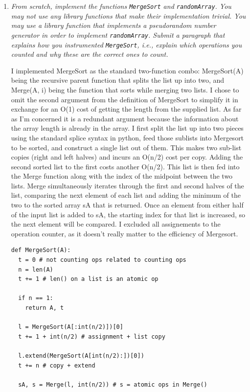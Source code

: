 \documentclass[12pt]{article} \setlength{\oddsidemargin}{0in}
\begin{document}
\begin{enumerate}
\item\textit{From scratch, implement the functions \texttt{MergeSort} and \texttt{randomArray}. You may not use any library functions that make their implementation trivial. You may use a library function that implements a pseudorandom number generator in order to implement \texttt{randomArray}.
Submit a paragraph that explains how you instrumented \texttt{MergeSort}, i.e., explain which operations you counted and why these are the correct ones to count.} 

I implemented MergeSort as the standard two-function combo: MergeSort(A) being the recursive parent function that splits the list up into two, and Merge(A, i) being the function that sorts while merging two lists. I chose to omit the second argument from the definition of MergeSort to simplify it in exchange for an O(1) cost of getting the length from the supplied list. As far as I'm concerned it is a redundant argument because the information about the array length is already in the array. I first split the list up into two pieces using the standard splice syntax in python, feed those sublists into Mergesort to be sorted, and construct a single list out of them. This makes two sub-list copies (right and left halves) and incurs an O(n/2) cost per copy. Adding the second sorted list to the first costs another O(n/2). This list is then fed into the Merge function along with the index of the midpoint between the two lists. Merge simultaneously iterates through the first and second halves of the list, comparing the next element of each list and adding the minimum of the two to the sorted array sA that is returned. Once an element from either half of the input list is added to sA, the starting index for that list is increased, so the next element will be compared. I excluded all assignements to the operation counter, as it doesn't really matter to the efficiency of Mergesort. 
\pagebreak
\begin{verbatim}
def MergeSort(A):
  t = 0 # not counting ops related to counting ops
  n = len(A) 
  t += 1 # len() on a list is an atomic op
  
  if n == 1:
    return A, t
  
  l = MergeSort(A[:int(n/2)])[0] 
  t += 1 + int(n/2) # assignment + list copy
  
  l.extend(MergeSort(A[int(n/2):])[0]) 
  t += n # copy + extend

  sA, s = Merge(l, int(n/2)) # s = atomic ops in Merge()
  

\end{verbatim}
\end{enumerate}
\end{document}
